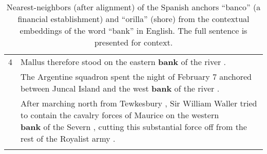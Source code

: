 \documentclass[11pt,a4paper]{article}
\begin{document}
\begin{table*}[t]
\begin{center}
\begin{tabular}{ll}
    4 & Mallus therefore stood on the eastern \textbf{bank} of the river .                \\ \addlinespace[0.5ex]
    5 & The Argentine squadron spent the night of February 7 anchored between Juncal Island and the west \textbf{bank} of the river . \\ \addlinespace[0.5ex]
    6 & \specialcell{After marching north from Tewkesbury , Sir William Waller tried to contain the cavalry forces of Maurice on the western \\ \textbf{bank} of the Severn , cutting this substantial force off from the rest of the Royalist army .} \\ \addlinespace[0.5ex]

    \bottomrule
    \end{tabular}
    \smallskip
    \caption{Nearest-neighbors (after alignment) of the Spanish anchors ``banco'' (a financial establishment) and ``orilla'' (shore) from the contextual embeddings of the word ``bank'' in English. The full sentence is presented for context.}
    \label{tab:examples_bank}
    \end{center}
\end{table*}
\end{document}

